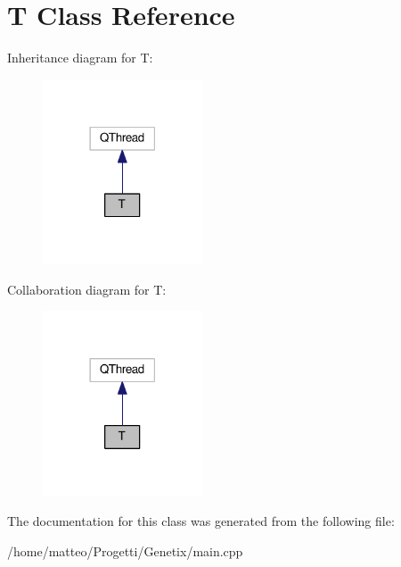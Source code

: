 \hypertarget{classT}{}\section{T Class Reference}
\label{classT}


Inheritance diagram for T\+:
\nopagebreak
\begin{figure}[H]
\begin{center}
\leavevmode
\includegraphics[width=134pt]{classT__inherit__graph}
\end{center}
\end{figure}


Collaboration diagram for T\+:
\nopagebreak
\begin{figure}[H]
\begin{center}
\leavevmode
\includegraphics[width=134pt]{classT__coll__graph}
\end{center}
\end{figure}


The documentation for this class was generated from the following file\+:\begin{DoxyCompactItemize}
\item 
/home/matteo/\+Progetti/\+Genetix/main.\+cpp\end{DoxyCompactItemize}
